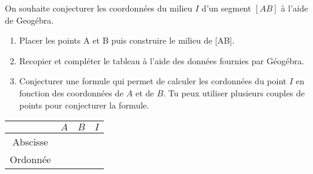 
On souhaite conjecturer les coordonnées du milieu $I$ d'un segment $[AB]$ à l'aide de Geogébra.

\begin{minipage}{0.58\linewidth}

\begin{enumerate}
\item Placer les points A et B puis construire le milieu de [AB].
\item Recopier et compléter le tableau à l'aide des données fournies par Géogébra. 
\item Conjecturer une formule qui permet de calculer les cordonnées du point $I$ en fonction des coordonnées de $A$ et de $B$. Tu peux utiliser plusieurs couples de points pour conjecturer la formule.
\end{enumerate}
\end{minipage}
\hfill
\begin{minipage}{0.38\linewidth}
\begin{tabular}{|c|c|c|c|}
\hline 
 & $A$ & $B$ & $I$ \\ 
\hline 
Abscisse &  &  &  \\ 
\hline 
Ordonnée&  &  &  \\ 
\hline  
\end{tabular} 
\end{minipage}